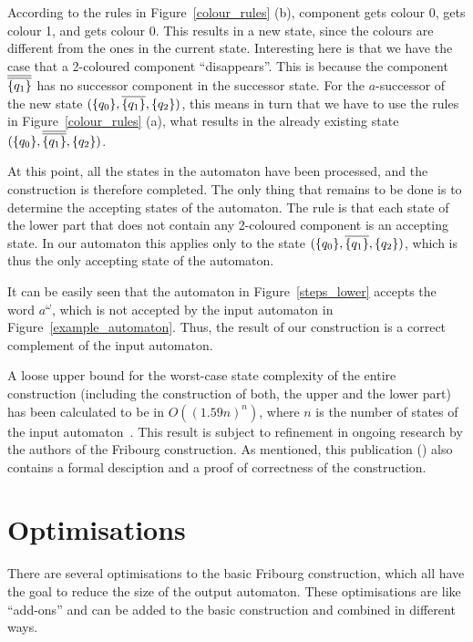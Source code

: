 \begin{center}
\PredCompsThree
\end{center}

According to the rules in Figure~\ref{colour_rules} (b), component  gets colour 0,  gets colour 1, and  gets colour 0. This results in a new state, since the colours are different from the ones in the current state. Interesting here is that we have the case that a 2-coloured component ``disappears''. This is because the component $\cl2{\qm1}$ has no successor component in the successor state. For the $a$-successor of the new state $(\qm0, \cl1{\qm1}, \qm2)$, this means in turn that we have to use the rules in Figure~\ref{colour_rules} (a), what results in the already existing state $(\qm0, \cl2{\qm1}, \qm2)$.

At this point, all the states in the automaton have been processed, and the construction is therefore completed. The only thing that remains to be done is to determine the accepting states of the automaton. The rule is that each state of the lower part that does not contain any 2-coloured component is an accepting state. In our automaton this applies only to the state $(\qm0, \cl1{\qm1}, \qm2)$, which is thus the only accepting state of the automaton.

It can be easily seen that the automaton in Figure~\ref{steps_lower} accepts the word $a^\omega$, which is not accepted by the input automaton in Figure~\ref{example_automaton}. Thus, the result of our construction is a correct complement of the input automaton.

A loose upper bound for the worst-case state complexity of the entire construction (including the construction of both, the upper and the lower part) has been calculated to be in $O((1.59n)^n)$, where $n$ is the number of states of the input automaton~\cite{2014_joel_ulrich}. This result is subject to refinement in ongoing research by the authors of the Fribourg construction. As mentioned, this publication (\cite{2014_joel_ulrich}) also contains a formal desciption and a proof of correctness of the construction.


\section{Optimisations}
\label{3_optimisations}
There are several optimisations to the basic Fribourg construction, which all have the goal to reduce the size of the output automaton. These optimisations are like ``add-ons'' and can  be added to the basic construction and combined in different ways.

